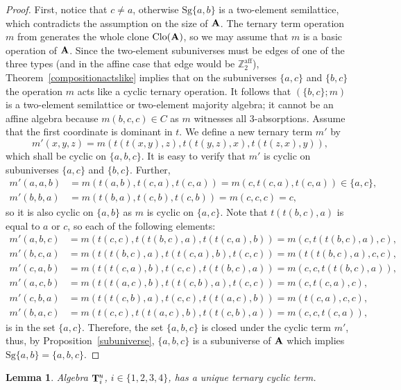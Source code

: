 \documentclass[11pt]{amsart}
\newcommand{\m}[1]{\mathbf{\uppercase{#1}}}
\newcommand{\n}{\scriptscriptstyle{\mathsf{N}}}
\newtheorem{lem}[thm]{Lemma}
\theoremstyle{definition}
\theoremstyle{remark}
\theoremstyle{plain}
\begin{document}
\begin{proof}
First, notice that $c\not= a$, otherwise $\mathrm{Sg}\{a,b\}$ is a two-element semilattice, which contradicts the assumption on the size of $\m a$. The ternary term operation $m$ from  generates the whole clone $\mathrm{Clo}({\m A})$, so we may assume that $m$ is a basic operation of $\m a$. Since the two-element subuniverses must be edges of one of the three types (and in the affine case that edge would be $\mathbb{Z}_2^{\mathrm{aff}}$), Theorem~\ref{compositionactslike} implies that on the subuniverses $\{a,c\}$ and $\{b,c\}$ the operation $m$ acts like a cyclic ternary operation. It follows that $(\{b,c\}; m)$ is a two-element semilattice or two-element majority algebra; it cannot be an affine algebra because $m(b,c,c)\in C$ as $m$ witnesses all 3-absorptions. Assume that the first coordinate is dominant in $t$. We define a new ternary term $m'$ by
$$m'(x,y,z) = m(t(t(x,y),z), t(t(y,z),x), t(t(z,x),y)),$$
 which shall be cyclic on $\{a,b,c\}$.
It is easy to verify that $m'$ is cyclic on subuniverses $\{a,c\}$ and $\{b,c\}$. Further,
\begin{align*}
m'(a,a,b)&=m(t(a,b), t(c,a), t(c,a))=m(c, t(c,a), t(c,a))\in \{a,c\},\\
m'(b,b,a)&=m(t(b,a), t(c,b), t(c,b))=m(c,c,c)=c,
\end{align*}
so it is also cyclic on $\{a,b\}$ as $m$ is cyclic on $\{a,c\}$.
Note that $t(t(b,c),a)$ is equal to $a$ or $c$, so each of the following elements:
\begin{align*}
    m'(a,b,c)&=m(t(c,c), t(t(b,c),a), t(t(c,a),b))=m(c, t(t(b,c),a), c),\\
    m'(b,c,a)&=m(t(t(b,c),a),t(t(c,a),b), t(c,c))=m(t(t(b,c),a), c, c),\\
    m'(c,a,b)&=m(t(t(c,a),b), t(c,c), t(t(b,c),a))=m(c,c,t(t(b,c),a)),\\
    m'(a,c,b)&=m(t(t(a,c),b), t(t(c,b),a), t(c,c))=m(c, t(c,a), c),\\
    m'(c,b,a)&=m(t(t(c,b),a), t(c,c), t(t(a,c),b))=m(t(c,a),c,c),\\
    m'(b,a,c)&=m(t(c,c), t(t(a,c),b), t(t(c,b),a))=m(c,c, t(c,a)),
\end{align*}
is in the set $\{a,c\}$. Therefore, the set $\{a,b,c\}$ is closed under the cyclic term $m'$, thus, by Proposition~\ref{subuniverse}, $\{a,b,c\}$ is a subuniverse of ${\m A}$ which implies $\mathrm{Sg}\{a,b\}=\{a,b,c\}.$
\end{proof} 

\begin{lem}\label{Aljahomework}
Algebra ${\m T}_i^{\n}$, $i\in \{1,2,3,4\}$, has a unique ternary cyclic term.
\end{lem}
\end{document}
